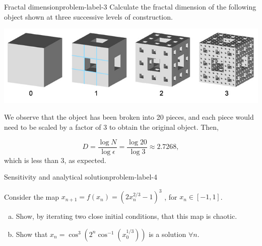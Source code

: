 \begin{problem}{Fractal dimension}{problem-label-3}
Calculate the fractal dimension of the following object
shown at three successive levels of construction.

\begin{center}
    \includegraphics[scale=0.5]{images/cube_fractal.jpg}
\end{center}
\end{problem}

We observe that the object has been broken into 20 pieces, 
and each piece would need to be scaled by a factor of 3
to obtain the original object. Then,

\[
\boxed{
    D = \frac{\log{N}}{\log{\epsilon}} = \frac{\log{20}}{\log{3}} \approx 2.7268,
}
\]
which is less than 3, as expected.


\begin{problem}{Sensitivity and analytical solution}{problem-label-4}

    Consider the map $x_{n+1} = f(x_n) = (2x_n^{2/3} - 1)^3$ , for $x_n \in [-1, 1]$.

    \begin{enumerate}[(a)]
        \item Show, by iterating two close initial conditions, that this map is chaotic.
        \item Show that $x_n = \cos^3 (2^n \cos^{-1} (x_0^{1/3}))$ is a solution $\forall n$.
    \end{enumerate}

\end{problem}

